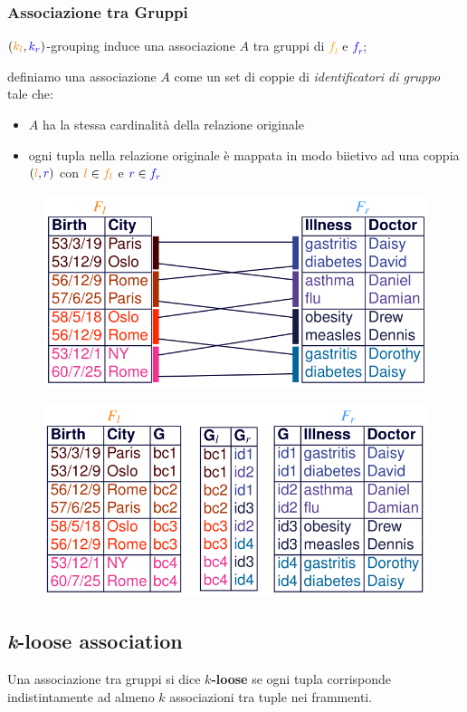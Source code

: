 \documentclass{report}
\begin{document}
\subsubsection{Associazione tra Gruppi}
$(\textcolor{orange}{k_l}, \textcolor{blue}{k_r})$-grouping induce una 
associazione $A$ tra gruppi di \textcolor{orange}{$f_l$} e \textcolor{blue}{$f_r$};

\noindent definiamo una associazione $A$ come un set di coppie di \textit{identificatori di gruppo} tale che:

\begin{itemize}
    \item $A$ ha la stessa cardinalità della relazione originale
    \item ogni tupla nella relazione originale è mappata in modo biietivo ad una coppia $(\textcolor{orange}{l}, \textcolor{blue}{r})$
    con $\textcolor{orange}{l} \in \textcolor{orange}{f_l}$ e $\textcolor{blue}{r} \in \textcolor{blue}{f_r}$
\end{itemize}

\begin{figure}[ht]
    \centering
    \includegraphics[width=0.7\linewidth]{images/publ-obf-ass/group-ass1.png}
\end{figure}

\begin{figure}[ht]
    \centering
    \includegraphics[width=0.7\linewidth]{images/publ-obf-ass/group-ass2.png}
\end{figure}

\newpage
\subsection{\textit{k}-loose association}
Una associazione tra gruppi si dice \textbf{$k$-loose} se ogni tupla corrisponde indistintamente ad almeno $k$ associazioni tra tuple nei frammenti.
\end{document}
